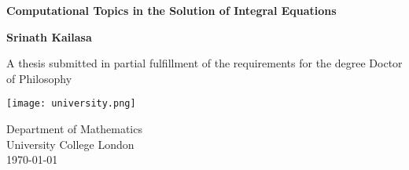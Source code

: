 \begin{titlepage}
    \begin{center}
        \vspace*{1cm}

        \Huge
        \textbf{Computational Topics in the Solution of Integral Equations}

        \Large
        \vspace{0.5cm}

        \vfill

        \textbf{Srinath Kailasa}

        \vspace{5cm}

        A thesis submitted in partial fulfillment of the requirements for the
        degree Doctor of Philosophy 

        \vspace{0.8cm}

        \texttt{[image: university.png]}

        \large
        Department of Mathematics\\
        University College London\\
        \today

    \end{center}
 \end{titlepage}